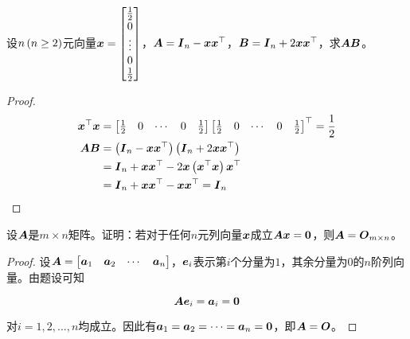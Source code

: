 \begin{problem}\label{problem-1.13}
设\(n\left( n\ge2 \right)\)元向量\(\boldsymbol{x}=\begin{bmatrix}\frac12\\0\\\vdots\\0\\\frac12\end{bmatrix}\)，\(\boldsymbol{A}=\boldsymbol{I}_n-\boldsymbol{x}\boldsymbol{x}^\top\)，\(\boldsymbol{B}=\boldsymbol{I}_n+2\boldsymbol{x}\boldsymbol{x}^\top\)，求\(\boldsymbol{A}\boldsymbol{B}\)。
\end{problem}
\begin{proof}
    \begin{align*}
        \boldsymbol{x}^\top\boldsymbol{x} & =
        \begin{bmatrix}
            \frac{1}{2} & 0 & \cdots & 0 & \frac{1}{2}
        \end{bmatrix}
        \begin{bmatrix}
            \frac{1}{2} & 0 & \cdots & 0 & \frac{1}{2}
        \end{bmatrix}^\top=\frac{1}{2}                                         \\
        \boldsymbol{A}\boldsymbol{B}      & =\left( \boldsymbol{I}_n-\boldsymbol{x}\boldsymbol{x}^\top \right)\left( \boldsymbol{I}_n+2\boldsymbol{x}\boldsymbol{x}^\top \right) \\
                        & =\boldsymbol{I}_n+\boldsymbol{x}\boldsymbol{x}^\top-2\boldsymbol{x}\left( \boldsymbol{x}^\top\boldsymbol{x} \right)\boldsymbol{x}^\top \\
                        & =\boldsymbol{I}_n+\boldsymbol{x}\boldsymbol{x}^\top-\boldsymbol{x}\boldsymbol{x}^\top=\boldsymbol{I}_n
    \end{align*}
\end{proof}

\begin{problem}\label{problem-1.14}
设\(\boldsymbol{A}\)是\(m\times n\)矩阵。证明：若对于任何\(n\)元列向量\(\boldsymbol{x}\)成立\(\boldsymbol{A}\boldsymbol{x}=\boldsymbol{0}\)，则\(\boldsymbol{A}=\boldsymbol{O}_{m\times n}\)。
\end{problem}
\begin{proof}
    设\(\boldsymbol{A}=\begin{bmatrix}\boldsymbol{a}_1&\boldsymbol{a}_2&\cdots&\boldsymbol{a}_n\end{bmatrix}\)，\(\boldsymbol{e}_i\)表示第\(i\)个分量为\(1\)，其余分量为\(0\)的\(n\)阶列向量。由题设可知

    \begin{equation*}
        \boldsymbol{A}\boldsymbol{e}_i=\boldsymbol{a}_i=\boldsymbol{0}
    \end{equation*}

    对\(i=1,2,\dots,n\)均成立。因此有\(\boldsymbol{a}_1=\boldsymbol{a}_2=\cdots=\boldsymbol{a}_n=\boldsymbol{0}\)，即\(\boldsymbol{A}=\boldsymbol{O}\)。
\end{proof}

